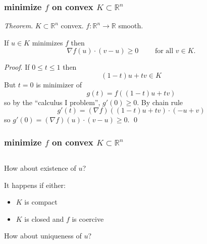 \documentclass{beamer}
\newcommand{\RR}{\mathbb{R}}
\newcommand{\grad}{\nabla}
\begin{document}
\begin{frame}
  \frametitle{minimize $f$ on convex $K\subset \RR^n$}

\emph{Theorem}.  $K\subset \RR^n$ convex.  $f:\RR^n\to\RR$ smooth.

\noindent If $u\in K$ minimizes $f$ then
   $$\grad f(u)\cdot (v-u) \ge 0 \qquad \text{ for all } v \in K.$$

\emph{Proof}.  If $0\le t\le 1$ then
    $$(1-t) u + t v\in K$$
But $t=0$ is minimizer of
    $$g(t) = f\left((1-t) u + t v\right)$$
so by the ``calculus I problem'', $g'(0) \ge 0$.  By chain rule
    $$g'(t) = (\grad f)((1-t) u + t v) \cdot (-u + v)$$
so $g'(0) = (\grad f)(u) \cdot (v-u) \ge 0$. \qed
\end{frame}


\begin{frame}
  \frametitle{minimize $f$ on convex $K\subset \RR^n$}

\begin{columns}
\begin{column}{0.7\textwidth}
How about existence of $u$?

It happens if either:
\begin{itemize}
\item $K$ is compact
\item $K$ is closed and $f$ is coercive
\end{itemize}

\bigskip
\bigskip

How about uniqueness of $u$?


\end{column}
\end{columns}
\end{frame}
\end{document}
